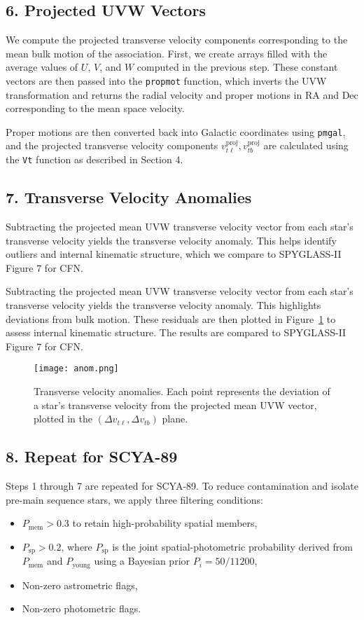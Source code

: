 \documentclass[11pt]{article}
\begin{document}
\subsection*{6. Projected UVW Vectors}
We compute the projected transverse velocity components corresponding to the mean bulk motion of the association. First, we create arrays filled with the average values of $U$, $V$, and $W$ computed in the previous step. These constant vectors are then passed into the \texttt{propmot} function, which inverts the UVW transformation and returns the radial velocity and proper motions in RA and Dec corresponding to the mean space velocity.

Proper motions are then converted back into Galactic coordinates using \texttt{pmgal}, and the projected transverse velocity components $v_{t\ell}^{\text{proj}}, v_{tb}^{\text{proj}}$ are calculated using the \texttt{Vt} function as described in Section 4.


\subsection*{7. Transverse Velocity Anomalies}
Subtracting the projected mean UVW transverse velocity vector from each star's transverse velocity yields the transverse velocity anomaly. This helps identify outliers and internal kinematic structure, which we compare to SPYGLASS-II Figure 7 for CFN.

Subtracting the projected mean UVW transverse velocity vector from each star's transverse velocity yields the transverse velocity anomaly. This highlights deviations from bulk motion. These residuals are then plotted in Figure~\ref{fig:anom} to assess internal kinematic structure. The results are compared to SPYGLASS-II Figure 7 for CFN.

\begin{figure}[H]
    \centering
    \texttt{[image: anom.png]}
    \caption{Transverse velocity anomalies. Each point represents the deviation of a star's transverse velocity from the projected mean UVW vector, plotted in the $(\Delta v_{t\ell}, \Delta v_{tb})$ plane.}
    \label{fig:anom}
\end{figure}


\subsection*{8. Repeat for SCYA-89}
Steps 1 through 7 are repeated for SCYA-89. To reduce contamination and isolate pre-main sequence stars, we apply three filtering conditions:
\begin{itemize}
  \item $P_{\text{mem}} > 0.3$ to retain high-probability spatial members,
  \item $P_{\text{sp}} > 0.2$, where $P_{\text{sp}}$ is the joint spatial-photometric probability derived from $P_{\text{mem}}$ and $P_{\text{young}}$ using a Bayesian prior $P_i = 50 / 11200$,
  \item Non-zero astrometric flags,
  \item Non-zero photometric flags.
\end{itemize}
\end{document}
